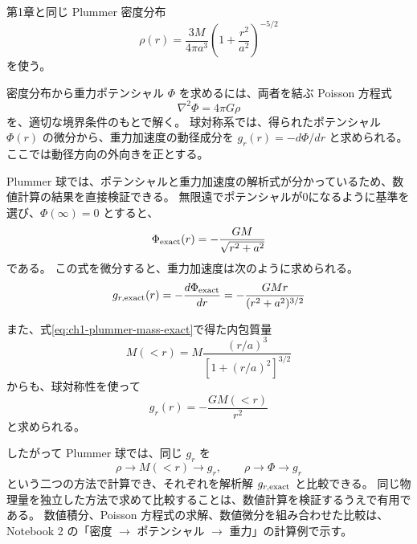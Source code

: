 第1章と同じ Plummer 密度分布
\begin{equation}
 \rho(r)=\frac{3M}{4\pi a^3}\left(1+\frac{r^2}{a^2}\right)^{-5/2}
\label{eq:ch2-plummer-density}
\end{equation}
を使う\cite{ryden2025}。

密度分布から重力ポテンシャル $\Phi$ を求めるには、両者を結ぶ Poisson 方程式
\begin{equation}
 \nabla^2\Phi=4\pi G\rho
\end{equation}
を、適切な境界条件のもとで解く。
球対称系では、得られたポテンシャル $\Phi(r)$ の微分から、重力加速度の動径成分を $g_r(r)=-d\Phi/dr$ と求められる。
ここでは動径方向の外向きを正とする。

Plummer 球では、ポテンシャルと重力加速度の解析式が分かっているため、数値計算の結果を直接検証できる。
無限遠でポテンシャルが0になるように基準を選び、$\Phi(\infty)=0$ とすると、
\begin{equation}
 \Phi_{\rm exact}(r)=-\frac{GM}{\sqrt{r^2+a^2}}
\label{eq:ch2-plummer-potential}
\end{equation}
である。
この式を微分すると、重力加速度は次のように求められる。
\begin{equation}
 g_{r,\rm exact}(r)=-\frac{d\Phi_{\rm exact}}{dr}=-\frac{GMr}{(r^2+a^2)^{3/2}}
\label{eq:ch2-plummer-gravity}
\end{equation}

また、式\eqref{eq:ch1-plummer-mass-exact}で得た内包質量
\begin{equation}
 M(<r)
 =M\frac{(r/a)^3}{[1+(r/a)^2]^{3/2}}
\label{eq:ch2-plummer-mass}
\end{equation}
からも、球対称性を使って
\begin{equation}
 g_r(r)=-\frac{GM(<r)}{r^2}
\label{eq:ch2-gravity-from-mass}
\end{equation}
と求められる。

したがって Plummer 球では、同じ $g_r$ を
\begin{equation}
 \rho\rightarrow M(<r)\rightarrow g_r,
 \qquad
 \rho\rightarrow\Phi\rightarrow g_r
\label{eq:ch2-three-routes}
\end{equation}
という二つの方法で計算でき、それぞれを解析解 $g_{r,\rm exact}$ と比較できる。
同じ物理量を独立した方法で求めて比較することは、数値計算を検証するうえで有用である。
数値積分、Poisson 方程式の求解、数値微分を組み合わせた比較は、Notebook 2 の「密度 $\rightarrow$ ポテンシャル $\rightarrow$ 重力」の計算例で示す。

